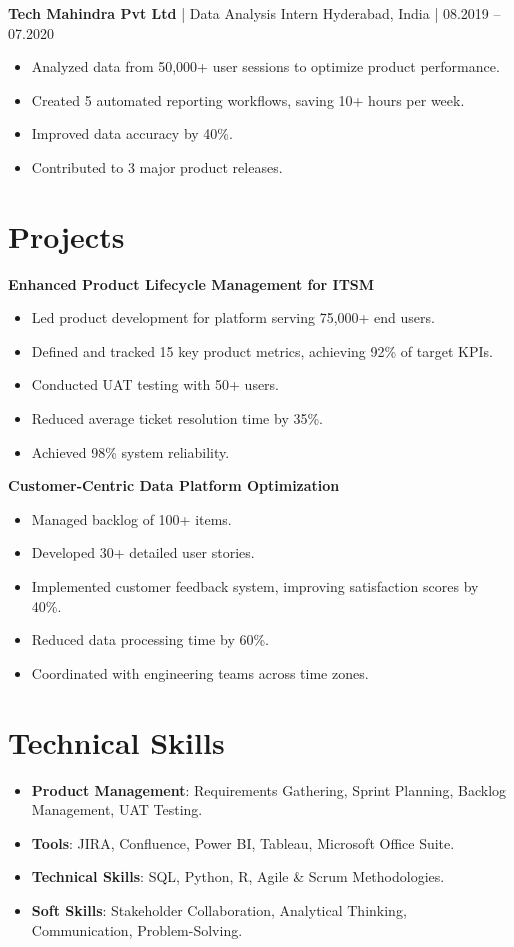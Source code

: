 \documentclass[10pt, letterpaper]{article}
\begin{document}
\textbf{Tech Mahindra Pvt Ltd} | Data Analysis Intern \hfill Hyderabad, India | 08.2019 -- 07.2020\\
\begin{itemize}[noitemsep]
    \item Analyzed data from 50,000+ user sessions to optimize product performance.
    \item Created 5 automated reporting workflows, saving 10+ hours per week.
    \item Improved data accuracy by 40\%.
    \item Contributed to 3 major product releases.
\end{itemize}

\section{Projects}
\textbf{Enhanced Product Lifecycle Management for ITSM}
\begin{itemize}[noitemsep]
    \item Led product development for platform serving 75,000+ end users.
    \item Defined and tracked 15 key product metrics, achieving 92\% of target KPIs.
    \item Conducted UAT testing with 50+ users.
    \item Reduced average ticket resolution time by 35\%.
    \item Achieved 98\% system reliability.
\end{itemize}

\textbf{Customer-Centric Data Platform Optimization}
\begin{itemize}[noitemsep]
    \item Managed backlog of 100+ items.
    \item Developed 30+ detailed user stories.
    \item Implemented customer feedback system, improving satisfaction scores by 40\%.
    \item Reduced data processing time by 60\%.
    \item Coordinated with engineering teams across time zones.
\end{itemize}

\section{Technical Skills}
\begin{itemize}[noitemsep]
    \item \textbf{Product Management}: Requirements Gathering, Sprint Planning, Backlog Management, UAT Testing.
    \item \textbf{Tools}: JIRA, Confluence, Power BI, Tableau, Microsoft Office Suite.
    \item \textbf{Technical Skills}: SQL, Python, R, Agile \& Scrum Methodologies.
    \item \textbf{Soft Skills}: Stakeholder Collaboration, Analytical Thinking, Communication, Problem-Solving.
\end{itemize}
\end{document}
